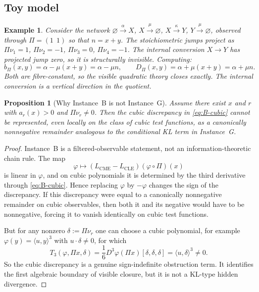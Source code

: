 \documentclass[11pt,a4paper]{article}
\numberwithin{equation}{section}
\theoremstyle{thmcompact}
\newtheorem{proposition}[theorem]{Proposition}
\newtheorem{example}[theorem]{Example}
\theoremstyle{remark}
\begin{document}
\subsection{Toy model}

\begin{example}\label{ex:bridge-B-toy}
Consider the network $\varnothing \xrightarrow{\alpha} X$, $X \xrightarrow{\mu} \varnothing$, $X \xrightarrow{\kappa} Y$, $Y \xrightarrow{\mu} \varnothing$, observed through $\Pi = (1\ \ 1)$ so that $n = x + y$. The stoichiometric jumps project as $\Pi\nu_1 = 1$, $\Pi\nu_2 = -1$, $\Pi\nu_3 = 0$, $\Pi\nu_4 = -1$. The internal conversion $X \to Y$ has projected jump zero, so it is structurally invisible. Computing:
\[
b_\Pi(x,y) = \alpha - \mu(x+y) = \alpha - \mu n, \qquad D_\Pi(x,y) = \alpha + \mu(x+y) = \alpha + \mu n.
\]
Both are fibre-constant, so the visible quadratic theory closes exactly. The internal conversion is a vertical direction in the quotient.
\end{example}

\begin{proposition}[Why Instance~B is not Instance~G]\label{prop:B-not-G}
Assume there exist $x$ and $r$ with $a_r(x)>0$ and $\Pi\nu_r\neq 0$. Then the cubic discrepancy in \eqref{eq:B-cubic} cannot be represented, even locally on the class of cubic test functions, as a canonically nonnegative remainder analogous to the conditional KL term in Instance~G.
\end{proposition}

\begin{proof}
Instance~B is a filtered-observable statement, not an information-theoretic chain rule. The map
\[
\varphi\longmapsto (L_{\mathrm{CME}}-L_{\mathrm{CLE}})(\varphi\circ\Pi)(x)
\]
is linear in $\varphi$, and on cubic polynomials it is determined by the third derivative through \eqref{eq:B-cubic}. Hence replacing $\varphi$ by $-\varphi$ changes the sign of the discrepancy. If this discrepancy were equal to a canonically nonnegative remainder on cubic observables, then both it and its negative would have to be nonnegative, forcing it to vanish identically on cubic test functions.

But for any nonzero $\delta:=\Pi\nu_r$ one can choose a cubic polynomial, for example $\varphi(y)=\langle u,y\rangle^3$ with $u\cdot\delta\neq 0$, for which
\[
T_3(\varphi,\Pi x,\delta)=\frac16 D^3\varphi(\Pi x)[\delta,\delta,\delta]=\langle u,\delta\rangle^3\neq 0.
\]
So the cubic discrepancy is a genuine sign-indefinite obstruction term. It identifies the first algebraic boundary of visible closure, but it is not a KL-type hidden divergence.
\end{proof}
\end{document}
